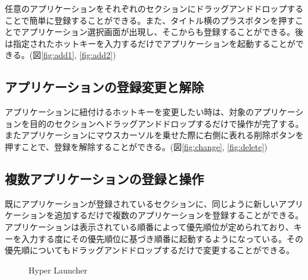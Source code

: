 任意のアプリケーションをそれぞれのセクションにドラッグアンドドロップすることで簡単に登録することができる。また、タイトル横のプラスボタンを押すことでアプリケーション選択画面が出現し、そこからも登録することができる。後は指定されたホットキーを入力するだけでアプリケーションを起動することができる。(図\ref{fig:add1}, \ref{fig:add2})

\subsection{アプリケーションの登録変更と解除}

アプリケーションに紐付けるホットキーを変更したい時は、対象のアプリケーションを目的のセクションへドラッグアンドドロップするだけで操作が完了する。またアプリケーションにマウスカーソルを乗せた際に右側に表れる削除ボタンを押すことで、登録を解除することができる。(図\ref{fig:change}, \ref{fig:delete})

\subsection{複数アプリケーションの登録と操作}

既にアプリケーションが登録されているセクションに、同じように新しいアプリケーションを追加するだけで複数のアプリケーションを登録することができる。アプリケーションは表示されている順番によって優先順位が定められており、キーを入力する度にその優先順位に基づき順番に起動するようになっている。その優先順についてもドラッグアンドドロップするだけで変更することができる。

\begin{figure}[h]
    \begin{center}
    \end{center}
    \caption{Hyper Launcher}
    \label{fig:hyper-launcher}
\end{figure}


